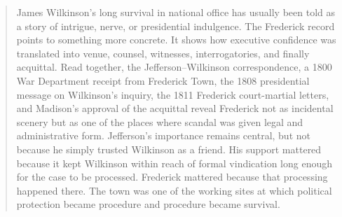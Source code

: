 \begin{abstract}
James Wilkinson's long survival in national office has usually been told as a story of intrigue, nerve, or presidential indulgence. The Frederick record points to something more concrete. It shows how executive confidence was translated into venue, counsel, witnesses, interrogatories, and finally acquittal. Read together, the Jefferson--Wilkinson correspondence, a 1800 War Department receipt from Frederick Town, the 1808 presidential message on Wilkinson's inquiry, the 1811 Frederick court-martial letters, and Madison's approval of the acquittal reveal Frederick not as incidental scenery but as one of the places where scandal was given legal and administrative form. Jefferson's importance remains central, but not because he simply trusted Wilkinson as a friend. His support mattered because it kept Wilkinson within reach of formal vindication long enough for the case to be processed. Frederick mattered because that processing happened there. The town was one of the working sites at which political protection became procedure and procedure became survival.
\end{abstract}
